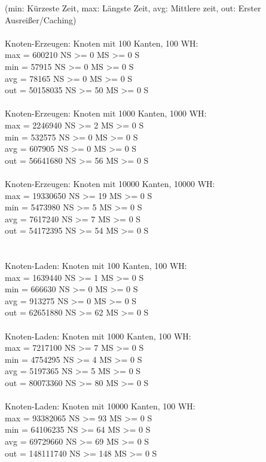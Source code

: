 \noindent
(min: Kürzeste Zeit, max: Längste Zeit, avg: Mittlere zeit, out: Erster Ausreißer/Caching)\\~\\


\noindent
Knoten-Erzeugen: Knoten mit 100 Kanten, 100 WH:\\
max = 600210 NS >= 0 MS >= 0 S\\
min = 57915 NS >= 0 MS >= 0 S\\
avg = 78165 NS >= 0 MS >= 0 S\\
out = 50158035 NS >= 50 MS >= 0 S\\
~\\
Knoten-Erzeugen: Knoten mit 1000 Kanten, 1000 WH:\\
max = 2246940 NS >= 2 MS >= 0 S\\
min = 532575 NS >= 0 MS >= 0 S\\
avg = 607905 NS >= 0 MS >= 0 S\\
out = 56641680 NS >= 56 MS >= 0 S\\
~\\
Knoten-Erzeugen: Knoten mit 10000 Kanten, 10000 WH:\\
max = 19330650 NS >= 19 MS >= 0 S\\
min = 5473980 NS >= 5 MS >= 0 S\\
avg = 7617240 NS >= 7 MS >= 0 S\\
out = 54172395 NS >= 54 MS >= 0 S\\
~\\~\\



Knoten-Laden: Knoten mit 100 Kanten, 100 WH:\\
max = 1639440 NS >= 1 MS >= 0 S\\
min = 666630 NS >= 0 MS >= 0 S\\
avg = 913275 NS >= 0 MS >= 0 S\\
out = 62651880 NS >= 62 MS >= 0 S\\
~\\
Knoten-Laden: Knoten mit 1000 Kanten, 100 WH:\\
max = 7217100 NS >= 7 MS >= 0 S\\
min = 4754295 NS >= 4 MS >= 0 S\\
avg = 5197365 NS >= 5 MS >= 0 S\\
out = 80073360 NS >= 80 MS >= 0 S\\
~\\
Knoten-Laden: Knoten mit 10000 Kanten, 100 WH:\\
max = 93382065 NS >= 93 MS >= 0 S\\
min = 64106235 NS >= 64 MS >= 0 S\\
avg = 69729660 NS >= 69 MS >= 0 S\\
out = 148111740 NS >= 148 MS >= 0 S\\
~\\

